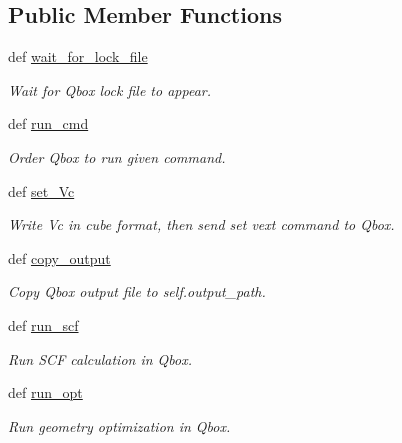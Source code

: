 \subsection*{Public Member Functions}
\begin{DoxyCompactItemize}
\item 
def \hyperlink{classpycdft_1_1dft__driver_1_1qbox__driver_1_1QboxDriver_a12adab83eaf8c203e7090df57a6f18cd}{wait\-\_\-for\-\_\-lock\-\_\-file}
\begin{DoxyCompactList}\small\item\em Wait for Qbox lock file to appear. \end{DoxyCompactList}\item 
def \hyperlink{classpycdft_1_1dft__driver_1_1qbox__driver_1_1QboxDriver_a2a92fb321ec4c409e41ffc05d5530e8d}{run\-\_\-cmd}
\begin{DoxyCompactList}\small\item\em Order Qbox to run given command. \end{DoxyCompactList}\item 
def \hyperlink{classpycdft_1_1dft__driver_1_1qbox__driver_1_1QboxDriver_aa1ee28917546ba09ef936e6d9d90f25b}{set\-\_\-\-Vc}
\begin{DoxyCompactList}\small\item\em Write Vc in cube format, then send set vext command to Qbox. \end{DoxyCompactList}\item 
def \hyperlink{classpycdft_1_1dft__driver_1_1qbox__driver_1_1QboxDriver_aa9bbf9ae41bef1093a71649267e583d7}{copy\-\_\-output}
\begin{DoxyCompactList}\small\item\em Copy Qbox output file to self.\-output\-\_\-path. \end{DoxyCompactList}\item 
def \hyperlink{classpycdft_1_1dft__driver_1_1qbox__driver_1_1QboxDriver_ad6a35ece44aeb4888cb8c7733d01e93e}{run\-\_\-scf}
\begin{DoxyCompactList}\small\item\em Run S\-C\-F calculation in Qbox. \end{DoxyCompactList}\item 
def \hyperlink{classpycdft_1_1dft__driver_1_1qbox__driver_1_1QboxDriver_a0484cb2353364e85a54a2035b06ac110}{run\-\_\-opt}
\begin{DoxyCompactList}\small\item\em Run geometry optimization in Qbox. \end{DoxyCompactList}\item 

\end{DoxyCompactItemize}
